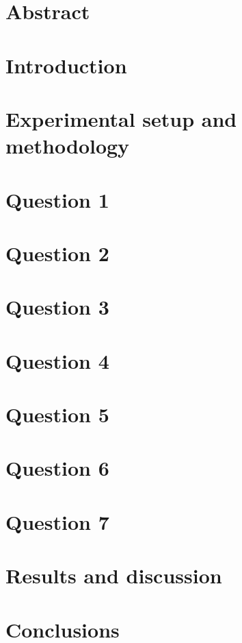 \documentclass[11pt]{article}
\numberwithin{equation}{section}
\begin{document}
\section*{Abstract}
\section*{Introduction}
\section*{Experimental setup and methodology}
\section*{Question 1}
\section*{Question 2}
\section*{Question 3}
\section*{Question 4}
\section*{Question 5}
\section*{Question 6}
\section*{Question 7}
\section*{Results and discussion}
\section*{Conclusions}
\begin{thebibliography}{00}

\end{thebibliography}
\end{document}
